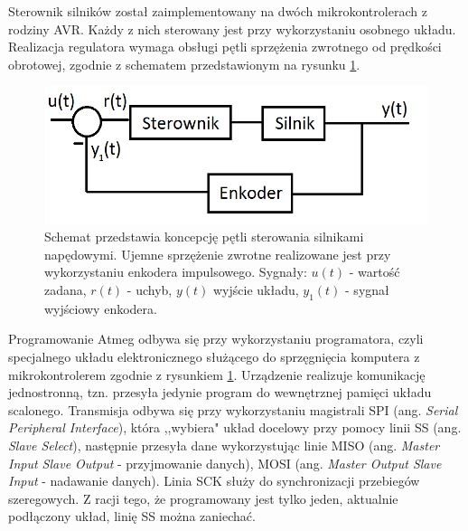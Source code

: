 Sterownik silników został zaimplementowany na dwóch mikrokontrolerach z rodziny AVR. Każdy z nich sterowany jest przy wykorzystaniu osobnego układu. Realizacja regulatora wymaga obsługi pętli sprzężenia zwrotnego od prędkości obrotowej, zgodnie z schematem przedstawionym na rysunku \ref{schem_ster}. 

  \begin{figure}[H]
    \begin{center}
      \includegraphics[scale=0.45]{imgs/sterowanie.png}
 	\caption[Schemat pętli sterowania silnikami.]{\small{Schemat przedstawia koncepcję pętli sterowania silnikami napędowymi. Ujemne sprzężenie zwrotne realizowane jest przy wykorzystaniu enkodera impulsowego. Sygnały: $u(t)$ - wartość zadana, $r(t)$ - uchyb, $y(t)$ wyjście układu, $y_1(t)$ - sygnał wyjściowy enkodera.}}
	\label{schem_ster}
    \end{center}
  \end{figure}  
  
Programowanie Atmeg odbywa się przy wykorzystaniu programatora, czyli specjalnego układu elektronicznego służącego do sprzęgnięcia komputera z mikrokontrolerem zgodnie z rysunkiem \ref{schem_ster}. Urządzenie realizuje komunikację jednostronną, tzn. przesyła jedynie program do wewnętrznej pamięci układu scalonego.  Transmisja odbywa się przy wykorzystaniu magistrali SPI (ang. \textit{Serial Peripheral Interface}), która ,,wybiera" układ docelowy przy pomocy linii SS (ang. \textit{Slave Select}), następnie przesyła dane wykorzystując linie MISO (ang. \textit{Master Input Slave Output} - przyjmowanie danych), MOSI (ang. \textit{Master Output Slave Input} - nadawanie danych). Linia SCK służy do synchronizacji przebiegów szeregowych. Z racji tego, że programowany jest tylko jeden, aktualnie podłączony układ, linię SS można zaniechać.

